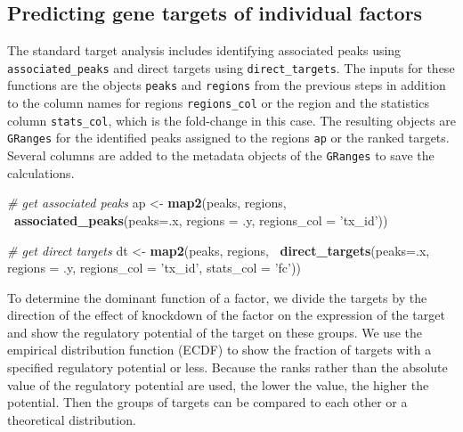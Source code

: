 \documentclass[9pt,a4paper,]{extarticle}
\newenvironment{Shaded}{\begin{snugshade}}{\end{snugshade}}
\newcommand{\CommentTok}[1]{\textcolor[rgb]{0.56,0.35,0.01}{\textit{#1}}}
\newcommand{\DataTypeTok}[1]{\textcolor[rgb]{0.13,0.29,0.53}{#1}}
\newcommand{\KeywordTok}[1]{\textcolor[rgb]{0.13,0.29,0.53}{\textbf{#1}}}
\newcommand{\NormalTok}[1]{#1}
\newcommand{\OperatorTok}[1]{\textcolor[rgb]{0.81,0.36,0.00}{\textbf{#1}}}
\newcommand{\StringTok}[1]{\textcolor[rgb]{0.31,0.60,0.02}{#1}}
\begin{document}
\hypertarget{predicting-gene-targets-of-individual-factors}{%
\subsection{Predicting gene targets of individual factors}\label{predicting-gene-targets-of-individual-factors}}

The standard target analysis includes identifying associated peaks using \texttt{associated\_peaks} and direct targets using \texttt{direct\_targets}. The inputs for these functions are the objects \texttt{peaks} and \texttt{regions} from the previous steps in addition to the column names for regions \texttt{regions\_col} or the region and the statistics column \texttt{stats\_col}, which is the fold-change in this case. The resulting objects are \texttt{GRanges} for the identified peaks assigned to the regions \texttt{ap} or the ranked targets. Several columns are added to the metadata objects of the \texttt{GRanges} to save the calculations.

\begin{Shaded}
\begin{Highlighting}[]
\CommentTok{# get associated peaks}
\NormalTok{ap <-}\StringTok{ }\KeywordTok{map2}\NormalTok{(peaks, regions,}
           \OperatorTok{~}\KeywordTok{associated_peaks}\NormalTok{(}\DataTypeTok{peaks=}\NormalTok{.x,}
                             \DataTypeTok{regions =}\NormalTok{ .y,}
                             \DataTypeTok{regions_col =} \StringTok{'tx_id'}\NormalTok{))}

\CommentTok{# get direct targets}
\NormalTok{dt <-}\StringTok{ }\KeywordTok{map2}\NormalTok{(peaks, regions,}
           \OperatorTok{~}\KeywordTok{direct_targets}\NormalTok{(}\DataTypeTok{peaks=}\NormalTok{.x,}
                           \DataTypeTok{regions =}\NormalTok{ .y,}
                           \DataTypeTok{regions_col =} \StringTok{'tx_id'}\NormalTok{,}
                           \DataTypeTok{stats_col =} \StringTok{'fc'}\NormalTok{))}
\end{Highlighting}
\end{Shaded}

To determine the dominant function of a factor, we divide the targets by the direction of the effect of knockdown of the factor on the expression of the target and show the regulatory potential of the target on these groups. We use the empirical distribution function (ECDF) to show the fraction of targets with a specified regulatory potential or less. Because the ranks rather than the absolute value of the regulatory potential are used, the lower the value, the higher the potential. Then the groups of targets can be compared to each other or a theoretical distribution.
\end{document}
